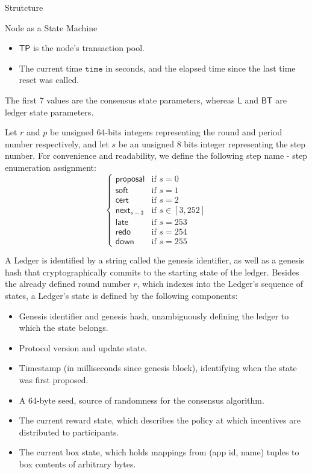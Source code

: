 \documentclass[10pt,a4paper]{article}
\begin{document}
\begin{section}{Strutcture}
\begin{subsection}{Node as a State Machine}
\begin{itemize}
    \item
    $\mathsf{TP}$ is the node's transaction pool.

    \item 
    The current time $\mathtt{time}$ in seconds, and the elapsed time since the last
    time reset was called.
\end{itemize}
The first 7 values are the {\sf consensus state parameters},
whereas $\mathsf{L}$ and $\mathsf{BT}$ are {\sf ledger state parameters}.

Let $r$ and $p$ be unsigned 64-bits integers representing the round and period number respectively, and 
let $s$  be an unsigned 8 bits integer representing the step number.
For convenience and readability, we define the following step name - step enumeration assignment:
\begin{equation}\label{table:s}
\left\{    
    \begin{array}{ll}
        \mathsf{proposal}&\mbox{if }s=0 \\
        \mathsf{soft}&\mbox{if }s=1 \\
        \mathsf{cert}&\mbox{if }s=2\\
        \mathsf{next}_{s-3}&\mbox{if }s\in [3, 252]\\
        \mathsf{late}&\mbox{if }s=253\\
        \mathsf{redo}&\mbox{if }s=254\\
        \mathsf{down}&\mbox{if }s=255
    \end{array}
\right.
\end{equation}

A Ledger is identified by a string called the genesis identifier, as well as a genesis hash that cryptographically 
commits to the starting state of the ledger.
Besides the already defined round number $r$, which indexes into the Ledger's sequence of states,
a Ledger's state is defined by the following components:
\begin{itemize}
    \item Genesis identifier and genesis hash, unambiguously defining the ledger 
    to which the state belongs.
    \item Protocol version and update state.
    \item Timestamp (in milliseconds since genesis block), identifying when the state was first proposed.
    \item A 64-byte seed, source of randomness for the consensus algorithm.
    \item The current reward state, which describes the policy at which incentives
    are distributed to participants.
    \item The current box state, which holds mappings from (app id, name) tuples
    to box contents of arbitrary bytes.
\end{itemize}


\end{subsection}
\end{section}
\end{document}

